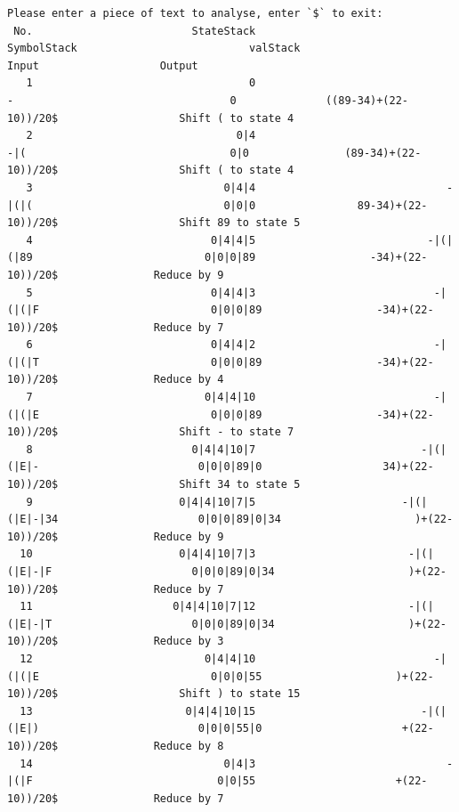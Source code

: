 \documentclass[UTF8]{ctexart}
\begin{document}
\begin{lstlisting}
Please enter a piece of text to analyse, enter `$` to exit:
 No.                         StateStack                        SymbolStack                           valStack                              Input                   Output
   1                                  0                                  -                                  0              ((89-34)+(22-10))/20$                   Shift ( to state 4
   2                                0|4                                -|(                                0|0               (89-34)+(22-10))/20$                   Shift ( to state 4
   3                              0|4|4                              -|(|(                              0|0|0                89-34)+(22-10))/20$                   Shift 89 to state 5
   4                            0|4|4|5                           -|(|(|89                           0|0|0|89                  -34)+(22-10))/20$               Reduce by 9
   5                            0|4|4|3                            -|(|(|F                           0|0|0|89                  -34)+(22-10))/20$               Reduce by 7
   6                            0|4|4|2                            -|(|(|T                           0|0|0|89                  -34)+(22-10))/20$               Reduce by 4
   7                           0|4|4|10                            -|(|(|E                           0|0|0|89                  -34)+(22-10))/20$                   Shift - to state 7
   8                         0|4|4|10|7                          -|(|(|E|-                         0|0|0|89|0                   34)+(22-10))/20$                   Shift 34 to state 5
   9                       0|4|4|10|7|5                       -|(|(|E|-|34                      0|0|0|89|0|34                     )+(22-10))/20$               Reduce by 9
  10                       0|4|4|10|7|3                        -|(|(|E|-|F                      0|0|0|89|0|34                     )+(22-10))/20$               Reduce by 7
  11                      0|4|4|10|7|12                        -|(|(|E|-|T                      0|0|0|89|0|34                     )+(22-10))/20$               Reduce by 3
  12                           0|4|4|10                            -|(|(|E                           0|0|0|55                     )+(22-10))/20$                   Shift ) to state 15
  13                        0|4|4|10|15                          -|(|(|E|)                         0|0|0|55|0                      +(22-10))/20$               Reduce by 8
  14                              0|4|3                              -|(|F                             0|0|55                      +(22-10))/20$               Reduce by 7

\end{lstlisting}
\end{document}
